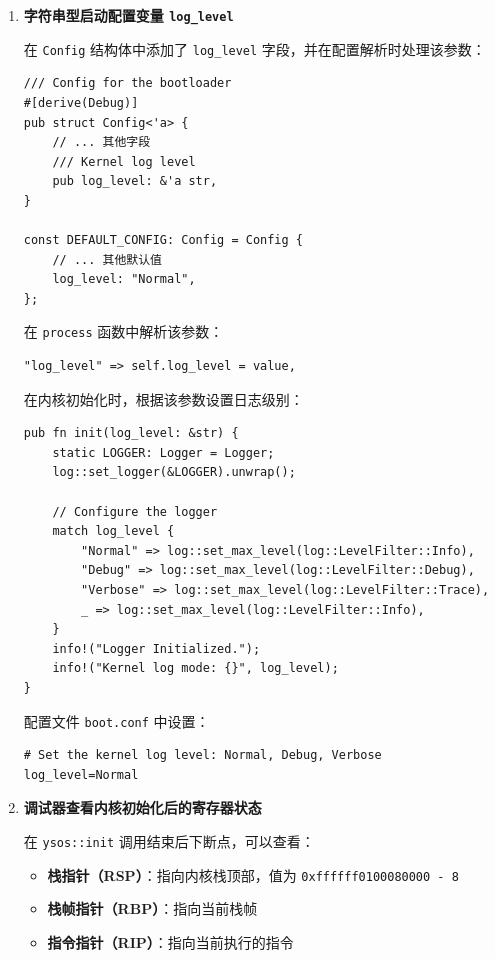 \documentclass{SYSUReport}
\begin{document}
\begin{enumerate}[label=\arabic*.]
    \item \textbf{字符串型启动配置变量 \texttt{log\_level}}

    在 \texttt{Config} 结构体中添加了 \texttt{log\_level} 字段，并在配置解析时处理该参数：

    \begin{verbatim}
/// Config for the bootloader
#[derive(Debug)]
pub struct Config<'a> {
    // ... 其他字段
    /// Kernel log level
    pub log_level: &'a str,
}

const DEFAULT_CONFIG: Config = Config {
    // ... 其他默认值
    log_level: "Normal",
};
    \end{verbatim}

    在 \texttt{process} 函数中解析该参数：

    \begin{verbatim}
"log_level" => self.log_level = value,
    \end{verbatim}

    在内核初始化时，根据该参数设置日志级别：

    \begin{verbatim}
pub fn init(log_level: &str) {
    static LOGGER: Logger = Logger;
    log::set_logger(&LOGGER).unwrap();

    // Configure the logger
    match log_level {
        "Normal" => log::set_max_level(log::LevelFilter::Info),
        "Debug" => log::set_max_level(log::LevelFilter::Debug),
        "Verbose" => log::set_max_level(log::LevelFilter::Trace),
        _ => log::set_max_level(log::LevelFilter::Info),
    }
    info!("Logger Initialized.");
    info!("Kernel log mode: {}", log_level);
}
    \end{verbatim}

    配置文件 \texttt{boot.conf} 中设置：

    \begin{verbatim}
# Set the kernel log level: Normal, Debug, Verbose
log_level=Normal
    \end{verbatim}

    \item \textbf{调试器查看内核初始化后的寄存器状态}

    在 \texttt{ysos::init} 调用结束后下断点，可以查看：

    \begin{itemize}
        \item \textbf{栈指针（RSP）}：指向内核栈顶部，值为 \texttt{0xffffff0100080000 - 8}
        \item \textbf{栈帧指针（RBP）}：指向当前栈帧
        \item \textbf{指令指针（RIP）}：指向当前执行的指令
    \end{itemize}


\end{enumerate}
\end{document}
